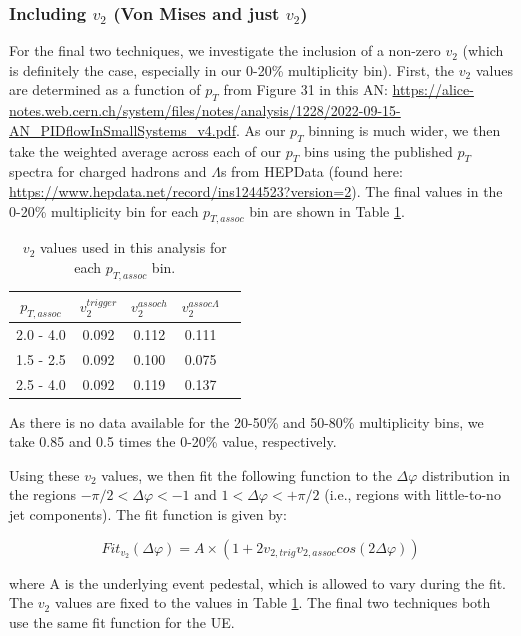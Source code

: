 \documentclass[ALICE,manyauthors]{ALICE_analysis_notes}
\begin{document}
\clearpage

\subsubsection{Including $v_{2}$ (Von Mises and just $v_{2}$)}
\label{including_v2}
For the final two techniques, we investigate the inclusion of a non-zero $v_{2}$ (which is definitely the case, especially in our 0-20\% multiplicity bin). First, the $v_{2}$ values are determined as a function of $p_{T}$ from Figure 31 in this AN: \url{https://alice-notes.web.cern.ch/system/files/notes/analysis/1228/2022-09-15-AN_PIDflowInSmallSystems_v4.pdf}. As our $p_{T}$ binning is much wider, we then take the weighted average across each of our $p_{T}$ bins using the published $p_{T}$ spectra for charged hadrons and $\Lambda$s from HEPData (found here: \url{https://www.hepdata.net/record/ins1244523?version=2}). The final values in the 0-20\% multiplicity bin for each $p_{T, assoc}$ bin are shown in Table \ref{v2_table}. 

\begin{table}[h!]
\centering
\begin{tabular}{| c || c | c | c | c | }
\hline
$p_{T, assoc}$ & $v_{2}^{trigger}$ & $v_{2}^{assoc h}$ & $v_{2}^{assoc \Lambda}$ \\
\hline
2.0 - 4.0 & 0.092 & 0.112 & 0.111 \\
1.5 - 2.5 & 0.092 & 0.100 & 0.075 \\
2.5 - 4.0 & 0.092 & 0.119 & 0.137 \\
\hline
\end{tabular}
\caption{$v_{2}$ values used in this analysis for each $p_{T, assoc}$ bin.}
\label{v2_table}
\end{table}

As there is no data available for the 20-50\% and 50-80\% multiplicity bins, we take 0.85 and 0.5 times the 0-20\% value, respectively. 

Using these $v_{2}$ values, we then fit the following function to the $\Delta\varphi$ distribution in the regions $-\pi/2 < \Delta\varphi < -1$ and $1 < \Delta\varphi < +\pi/2$ (i.e., regions with little-to-no jet components). The fit function is given by:

\begin{equation}
Fit_{v_{2}}(\Delta\varphi) = A\times(1 + 2v_{2, trig}v_{2, assoc}cos(2\Delta\varphi))
\end{equation}

where A is the underlying event pedestal, which is allowed to vary during the fit. The $v_{2}$ values are fixed to the values in Table \ref{v2_table}. The final two techniques both use the same fit function for the UE.
\end{document}
